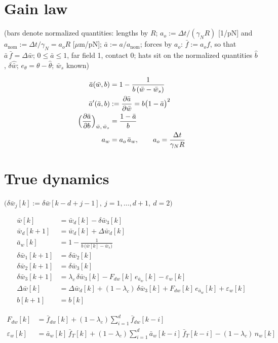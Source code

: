 \documentclass[11pt,a4paper,fontset=none]{ctexart}
\newcommand{\ba}{\bar{a}}
\newcommand{\bw}{\bar{w}}
\newcommand{\dW}{\Delta\bw}
\newcommand{\ap}{\ba'}
\newcommand{\bh}{\hat{b}}
\begin{document}
\section{Gain law}

(bars denote normalized quantities: lengths by $R$; $a_o := \Delta t/(\gamma_N R)$ [1/pN] and
$a_{\mathrm{nom}} := \Delta t/\gamma_N = a_o R$ [$\mu$m/pN]; $\ba := a/a_{\mathrm{nom}}$; forces by $a_o$:
$\bar f := a_o f$, so that $\ba\,\bar f = \dW$; $0 \le \ba \le 1$, far field 1, contact 0;
hats sit on the normalized quantities $\bh$, $\delta\hat{\bw}$; $e_\theta = \theta - \hat\theta$; $\bw_s$ known)

\begin{align*}
\ba(\bw, b)   &= 1 - \frac{1}{b\,(\bw - \bw_s)} \\
\ap(\ba, b)   &:= \frac{\partial\ba}{\partial\bw} = b\bigl(1-\ba\bigr)^{2} \\
\Bigl(\frac{\partial\ba}{\partial b}\Bigr)_{\bw,\,\bw_s} &= \frac{1-\ba}{b} \\
a_w &= a_o\,\ba_w , \qquad a_o = \frac{\Delta t}{\gamma_N R}
\end{align*}

\section{True dynamics}

$\bigl(\delta\bw_j[k] := \delta\bw[k-d+j-1],\ j = 1,\dots,d+1,\ d = 2\bigr)$

\begin{align*}
\bw[k]           &= \bw_d[k] - \delta\bw_3[k] \\
\bw_d[k+1]       &= \bw_d[k] + \Delta\bw_d[k] \\
\ba_w[k]         &= 1 - \frac{1}{b\,\bigl(\bw[k] - \bw_s\bigr)} \\
\delta\bw_1[k+1] &= \delta\bw_2[k] \\
\delta\bw_2[k+1] &= \delta\bw_3[k] \\
\delta\bw_3[k+1] &= \lambda_c\,\delta\bw_3[k] - F_{dw}[k]\,e_{\ba_w}[k] - \varepsilon_w[k] \\
\dW[k]           &= \Delta\bw_d[k] + (1-\lambda_c)\,\delta\bw_3[k] + F_{dw}[k]\,e_{\ba_w}[k] + \varepsilon_w[k] \\
b[k+1]           &= b[k]
\end{align*}

\begin{align*}
F_{dw}[k]        &= \bar f_{dw}[k] + (1-\lambda_c)\sum_{i=1}^{d}\bar f_{dw}[k-i] \\
\varepsilon_w[k] &= \ba_w[k]\,\bar f_T[k] + (1-\lambda_c)\sum_{i=1}^{d}\ba_w[k-i]\,\bar f_T[k-i] - (1-\lambda_c)\,n_w[k]
\end{align*}
\end{document}
